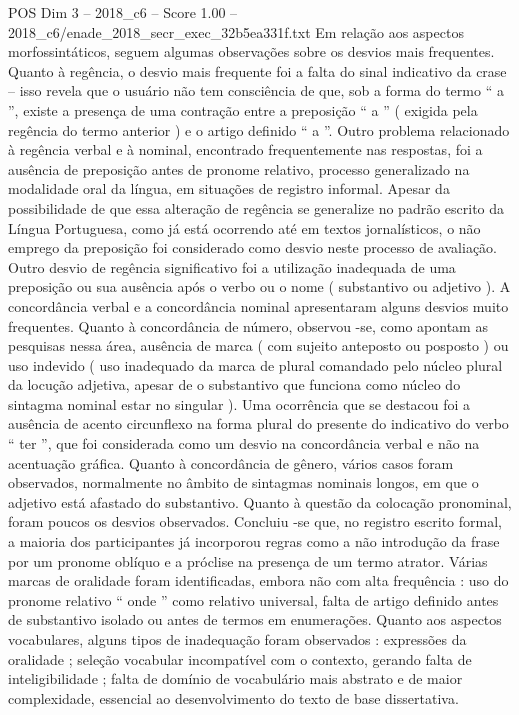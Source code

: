 \begin{textsample}{POS Dim 3 – 2018\_c6 – Score 1.00 – 2018\_c6/enade\_2018\_secr\_exec\_32b5ea331f.txt}
Em relação aos aspectos morfossintáticos, seguem algumas observações sobre os desvios mais frequentes.
Quanto à regência, o desvio mais frequente foi a falta do sinal indicativo da crase – isso revela que o usuário não tem consciência de que, sob a forma do termo “ a ”, existe a presença de uma contração entre a preposição “ a ” ( exigida pela regência do termo anterior ) e o artigo definido “ a ”.
Outro problema relacionado à regência verbal e à nominal, encontrado frequentemente nas respostas, foi a ausência de preposição antes de pronome relativo, processo generalizado na modalidade oral da língua, em situações de registro informal.
Apesar da possibilidade de que essa alteração de regência se generalize no padrão escrito da Língua Portuguesa, como já está ocorrendo até em textos jornalísticos, o não emprego da preposição foi considerado como desvio neste processo de avaliação.
Outro desvio de regência significativo foi a utilização inadequada de uma preposição ou sua ausência após o verbo ou o nome ( substantivo ou adjetivo ).
A concordância verbal e a concordância nominal apresentaram alguns desvios muito frequentes.
Quanto à concordância de número, observou -se, como apontam as pesquisas nessa área, ausência de marca ( com sujeito anteposto ou posposto ) ou uso indevido ( uso inadequado da marca de plural comandado pelo núcleo plural da locução adjetiva, apesar de o substantivo que funciona como núcleo do sintagma nominal estar no singular ).
Uma ocorrência que se destacou foi a ausência de acento circunflexo na forma plural do presente do indicativo do verbo “ ter ”, que foi considerada como um desvio na concordância verbal e não na acentuação gráfica.
Quanto à concordância de gênero, vários casos foram observados, normalmente no âmbito de sintagmas nominais longos, em que o adjetivo está afastado do substantivo.
Quanto à questão da colocação pronominal, foram poucos os desvios observados.
Concluiu -se que, no registro escrito formal, a maioria dos participantes já incorporou regras como a não introdução da frase por um pronome oblíquo e a próclise na presença de um termo atrator.
Várias marcas de oralidade foram identificadas, embora não com alta frequência : uso do pronome relativo “ onde ” como relativo universal, falta de artigo definido antes de substantivo isolado ou antes de termos em enumerações.
Quanto aos aspectos vocabulares, alguns tipos de inadequação foram observados : expressões da oralidade ; seleção vocabular incompatível com o contexto, gerando falta de inteligibilidade ; falta de domínio de vocabulário mais abstrato e de maior complexidade, essencial ao desenvolvimento do texto de base dissertativa.

\end{textsample}
